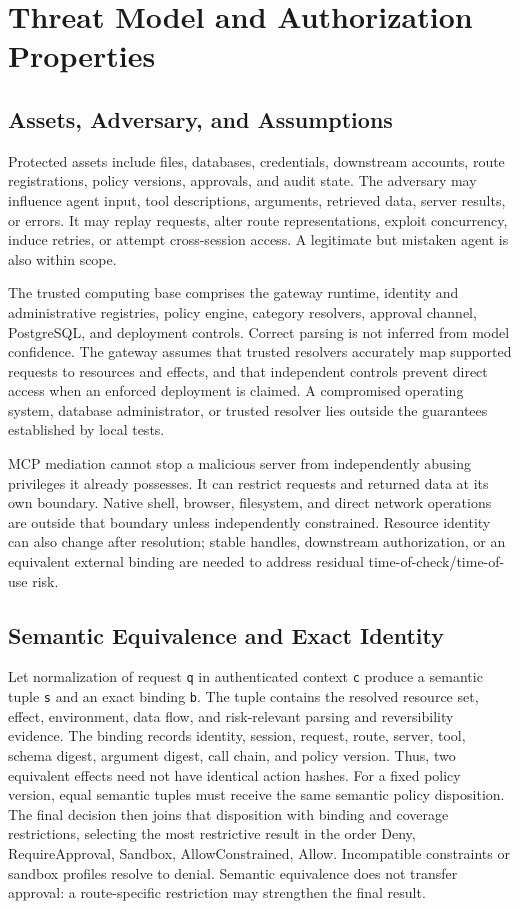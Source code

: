 \documentclass[conference,letterpaper]{IEEEtran}
\begin{document}
\section{Threat Model and Authorization Properties}
\subsection{Assets, Adversary, and Assumptions}
Protected assets include files, databases, credentials, downstream accounts, route registrations, policy versions, approvals, and audit state. The adversary may influence agent input, tool descriptions, arguments, retrieved data, server results, or errors. It may replay requests, alter route representations, exploit concurrency, induce retries, or attempt cross-session access. A legitimate but mistaken agent is also within scope.

The trusted computing base comprises the gateway runtime, identity and administrative registries, policy engine, category resolvers, approval channel, PostgreSQL, and deployment controls. Correct parsing is not inferred from model confidence. The gateway assumes that trusted resolvers accurately map supported requests to resources and effects, and that independent controls prevent direct access when an enforced deployment is claimed. A compromised operating system, database administrator, or trusted resolver lies outside the guarantees established by local tests.

MCP mediation cannot stop a malicious server from independently abusing privileges it already possesses. It can restrict requests and returned data at its own boundary. Native shell, browser, filesystem, and direct network operations are outside that boundary unless independently constrained. Resource identity can also change after resolution; stable handles, downstream authorization, or an equivalent external binding are needed to address residual time-of-check/time-of-use risk.

\subsection{Semantic Equivalence and Exact Identity}
Let normalization of request \texttt{q} in authenticated context \texttt{c} produce a semantic tuple \texttt{s} and an exact binding \texttt{b}. The tuple contains the resolved resource set, effect, environment, data flow, and risk-relevant parsing and reversibility evidence. The binding records identity, session, request, route, server, tool, schema digest, argument digest, call chain, and policy version. Thus, two equivalent effects need not have identical action hashes. For a fixed policy version, equal semantic tuples must receive the same semantic policy disposition. The final decision then joins that disposition with binding and coverage restrictions, selecting the most restrictive result in the order Deny, RequireApproval, Sandbox, AllowConstrained, Allow. Incompatible constraints or sandbox profiles resolve to denial. Semantic equivalence does not transfer approval: a route-specific restriction may strengthen the final result.
\end{document}
